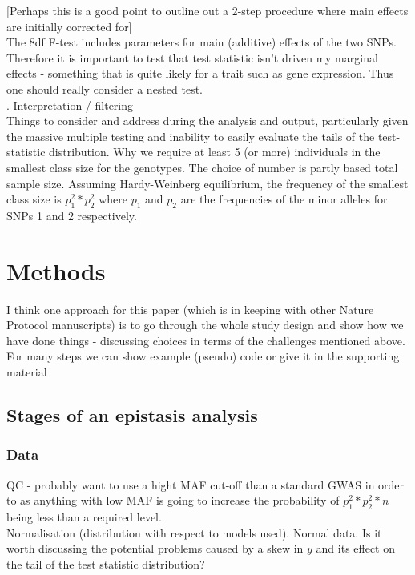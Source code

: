 \documentclass{article}
\begin{document}
[Perhaps this is a good point to outline out a 2-step procedure where main effects are initially corrected for] \\
The 8df F-test includes parameters for main (additive) effects of the two SNPs. Therefore it is important to test that test statistic isn't driven my marginal effects - something that is quite likely for a trait such as gene expression. Thus one should really consider a nested test.  \\
. Interpretation / filtering \\
\newline
Things to consider and address during the analysis and output, particularly given the massive multiple testing and inability to easily evaluate the tails of the test-statistic distribution. Why we require at least 5 (or more) individuals in the smallest class size for the genotypes. The choice of number is partly based total sample size. Assuming Hardy-Weinberg equilibrium, the frequency of the smallest class size is $p_1^2 * p_2^2$ where $p_1$ and $p_2$ are the frequencies of the minor alleles for SNPs 1 and 2 respectively.      
\newline
\section{Methods}

I think one approach for this paper (which is in keeping with other Nature Protocol manuscripts) is to go through the whole study design and show how we have done things - discussing choices in terms of the challenges mentioned above. For many steps we can show example (pseudo) code or give it in the supporting material  

\subsection{Stages of an epistasis analysis}

\subsubsection{Data}

QC - probably want to use a hight MAF cut-off than a standard GWAS in order to as anything with low MAF is going to increase the probability of $p_1^2 * p_2^2 * n$ being less than a required level. \\
Normalisation (distribution with respect to models used). Normal data. Is it worth discussing the potential problems caused by a skew in $y$ and its effect on the tail of the test statistic distribution?  \\
\end{document}
